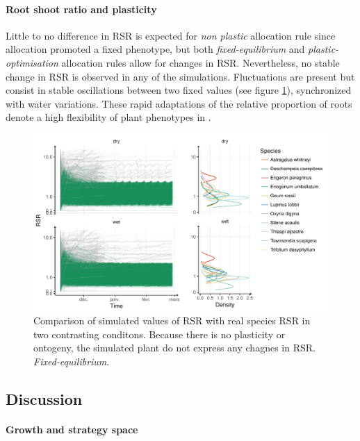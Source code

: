 
\paragraph{Root shoot ratio and plasticity}

Little to no difference in RSR is expected for \textit{non plastic} allocation rule since allocation promoted a fixed phenotype, but both \textit{fixed-equilibrium} and \textit{plastic-optimisation} allocation rules allow for changes in RSR. Nevertheless, no stable change in RSR is observed in any of the simulations. Fluctuations are present but consist in stable oscillations between two fixed values (see figure \ref{fig:comparison_RSR}), synchronized with water variations. These rapid adaptations of the relative proportion of roots denote a high flexibility of plant phenotypes in \model.


\begin{figure}\label{fig:comparison_RSR}
\includegraphics[width = \textwidth]{./2_PP/Figures/Calibration/RSR_full_sim_f-e.pdf}
\caption{Comparison of simulated values of RSR with real species RSR in two contrasting conditons. Because there is no plasticity or ontogeny, the simulated plant do not express any chagnes in RSR. \textit{Fixed-equilibrium}.}
\end{figure}

\subsection{Discussion}

\paragraph{Growth and strategy space}

